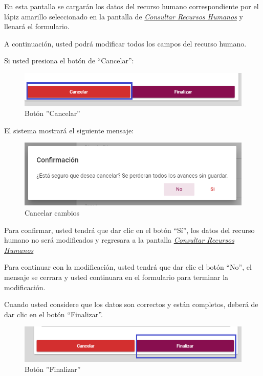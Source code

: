                 En esta pantalla se cargarán los datos del recurso humano correspondiente por el lápiz amarillo seleccionado en la pantalla de \hyperlink{consultarRH}{\textit{Consultar Recursos Humanos}} y llenará el formulario.
            
                A continuación, usted podrá modificar todos los campos del recurso humano.
                               
                Si usted presiona el botón de “Cancelar”:
                
                \begin{figure}[!hbtp]
                    \centering
                    \hypertarget{cancel2}{\includegraphics[width=0.7\linewidth]{images/SP1/BtnCancelar2}}
                    \caption{Botón ''Cancelar''}
                    \label{cancel2}
                \end{figure}
                
                El sistema mostrará el siguiente mensaje:
                  \clearpage
                 \begin{figure}[!hbtp]
                    \centering
                    \includegraphics[width=0.4\linewidth]{images/SP1/MSG29}
                    \caption{Cancelar cambios}
                    \label{mensaje29}
             
                \end{figure}
              
                Para confirmar, usted tendrá que dar clic en el botón “Sí”, los datos del recurso humano no será modificados  y regresara a la pantalla \hyperlink{consultarRH}{\textit{Consultar Recursos Humanos}}
            
                Para continuar con la modificación, usted tendrá que  dar clic el botón “No”, el mensaje se cerrara y usted continuara en el formulario para terminar la modificación.
                
                Cuando usted considere que los datos son correctos y están completos, deberá de dar clic en el botón “Finalizar”.
                \begin{figure}[!hbtp]
                    \centering
                    \hypertarget{btnfin}{\includegraphics[width=0.7\linewidth]{images/SP1/BtnFinalizar}}
                    \caption{Botón ''Finalizar''}
                    \label{btnfin}
                \end{figure}
                
